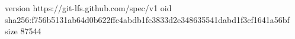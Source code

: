 version https://git-lfs.github.com/spec/v1
oid sha256:f756b5131ab64d0b622ffc4abdb1fc3833d2e348635541dabd1f3cf1641a56bf
size 87544

